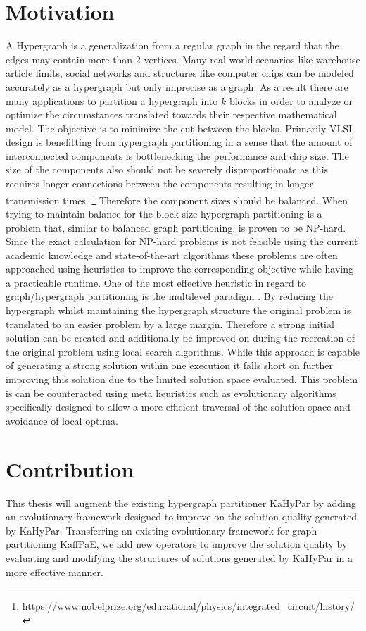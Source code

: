 \documentclass[a4paper,12pt,bibtotoc,titlepage, liststotoc,BCOR7mm,headsepline,pointlessnumbers]{scrbook}
\numberwithin{equation}{section}
\begin{document}
\section{Motivation}
A Hypergraph is a generalization from a regular graph in the regard that the edges may contain more than 2 vertices.
Many real world scenarios like warehouse article limits, social networks and structures like computer chips can be modeled accurately as a hypergraph but only imprecise as a graph. As a result there are many applications to partition a hypergraph into $k$ blocks in order to analyze or optimize the circumstances translated towards their respective mathematical model. The objective is to minimize the cut between the blocks. Primarily VLSI design is benefitting from hypergraph partitioning in a sense that the amount of interconnected components is bottlenecking the performance and chip size. \cite{boese1992high} The size of the components also should not be severely disproportionate as this requires longer connections between the components resulting in longer transmission times. \footnote{https://www.nobelprize.org/educational/physics/integrated_circuit/history/} Therefore the component sizes should be balanced.
When trying to maintain balance for the block size hypergraph partitioning is a problem that, similar to balanced graph partitioning, is proven to be NP-hard. \cite{garey2002computers} Since the exact calculation for NP-hard problems is not feasible using the current academic knowledge and state-of-the-art algorithms these problems are often approached using heuristics to improve the corresponding objective while having a practicable runtime. One of the most effective heuristic in regard to graph/hypergraph partitioning is the multilevel paradigm \cite{bulucc2016recent}. By reducing the hypergraph whilst maintaining the hypergraph structure the original problem is translated to an easier problem by a large margin. Therefore a strong initial solution can be created and additionally be improved on during the recreation of the original problem using local search algorithms. While this approach is capable of generating a strong solution within one execution it falls short on further improving this solution due to the limited solution space evaluated. This problem is can be counteracted using meta heuristics such as evolutionary algorithms specifically designed to allow a more efficient traversal of the solution space and avoidance of local optima. 

\section{Contribution}
This thesis will augment the existing hypergraph partitioner KaHyPar by adding an evolutionary framework designed to improve on the solution quality generated by KaHyPar. Transferring an existing evolutionary framework for graph partitioning KaffPaE, we add new operators to improve the solution quality by evaluating and modifying the structures of solutions generated by KaHyPar in a more effective manner. 
\end{document}
